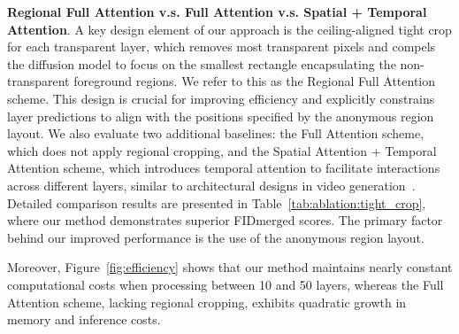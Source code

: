 \begin{table}[t]
\begin{minipage}[c]{1\linewidth}
\label{tab:ablation:layer_number}
\end{minipage}
\hfill
\begin{minipage}[c]{1\linewidth}
\centering
{}
\vspace{-2mm}
\caption{
\footnotesize{Effect of different caption length.}}
\label{tab:ablation:text_number}
\end{minipage}
\vspace{-5mm}
\end{table}

\vspace{1mm}
\noindent\textbf{Regional Full Attention v.s. Full Attention v.s. Spatial + Temporal Attention}. A key design element of our approach is the ceiling-aligned tight crop for each transparent layer, which removes most transparent pixels and compels the diffusion model to focus on the smallest rectangle encapsulating the non-transparent foreground regions. We refer to this as the Regional Full Attention scheme. This design is crucial for improving efficiency and explicitly constrains layer predictions to align with the positions specified by the anonymous region layout. We also evaluate two additional baselines: the Full Attention scheme, which does not apply regional cropping, and the Spatial Attention + Temporal Attention scheme, which introduces temporal attention to facilitate interactions across different layers, similar to architectural designs in video generation~\cite{blattmann2023align,guo2023animatediff}. Detailed comparison results are presented in Table~\ref{tab:ablation:tight_crop}, where our method demonstrates superior FID$\scriptstyle \text{merged}$ scores. The primary factor behind our improved performance is the use of the anonymous region layout.

Moreover, Figure~\ref{fig:efficiency} shows that our method maintains nearly constant computational costs when processing between 10 and 50 layers, whereas the Full Attention scheme, lacking regional cropping, exhibits quadratic growth in memory and inference costs.


